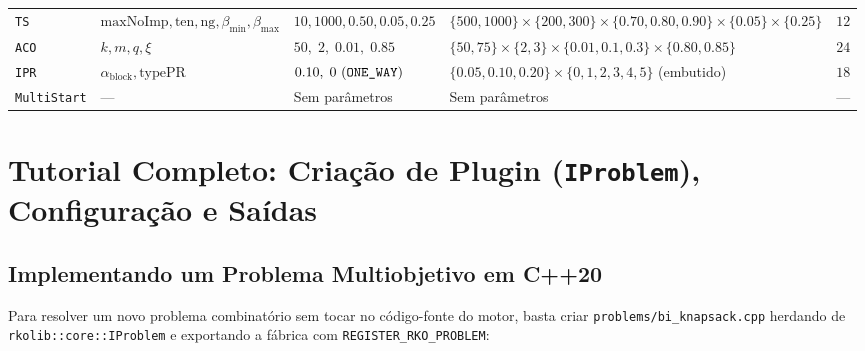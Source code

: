 \documentclass[11pt,a4paper]{article}
\begin{document}
\begin{small}
\begin{longtable}{@{}llp{4.3cm}p{5.5cm}r@{}}
\texttt{TS} & $\text{maxNoImp}, \text{ten}, \text{ng}, \beta_{\min}, \beta_{\max}$ & $10, 1000, 0.50, 0.05, 0.25$ & $\{500,1000\}\times\{200,300\}\times\{0.70,0.80,0.90\}\times\{0.05\}\times\{0.25\}$ & $12$ \\
\texttt{ACO} & $k, m, q, \xi$ & $50,\; 2,\; 0.01,\; 0.85$ & $\{50,75\}\times\{2,3\}\times\{0.01,0.1,0.3\}\times\{0.80,0.85\}$ & $24$ \\
\texttt{IPR} & $\alpha_{\text{block}}, \text{typePR}$ & $0.10,\; 0\text{ (\texttt{ONE\_WAY})}$ & $\{0.05,0.10,0.20\}\times\{0,1,2,3,4,5\}$ (embutido) & $18$ \\
\texttt{MultiStart} & --- & Sem parâmetros & Sem parâmetros & --- \\
\end{longtable}
\end{small}

\section{Tutorial Completo: Criação de Plugin (\texttt{IProblem}), Configuração e Saídas}
\label{sec:tutorial}

\subsection{Implementando um Problema Multiobjetivo em C++20}

Para resolver um novo problema combinatório sem tocar no código-fonte do motor, basta criar \texttt{problems/bi\_knapsack.cpp} herdando de \texttt{rkolib::core::IProblem} e exportando a fábrica com \texttt{REGISTER\_RKO\_PROBLEM}:
\end{document}
